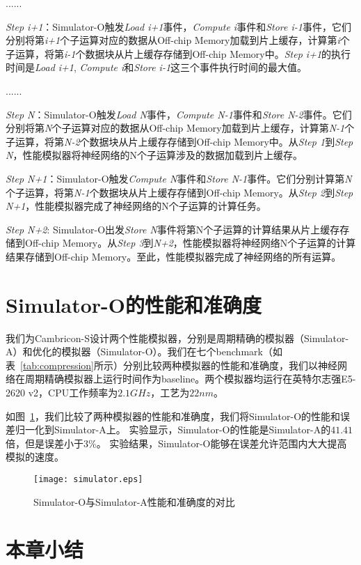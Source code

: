 ......

\emph{Step i+1}：Simulator-O触发\emph{Load i+1}事件，\emph{Compute i}事件和\emph{Store i-1}事件，它们分别将第\emph{i+1}个子运算对应的数据从Off-chip Memory加载到片上缓存，计算第\emph{i}个子运算，将第\emph{i-1}个数据块从片上缓存存储到Off-chip Memory中。\emph{Step i+1}的执行时间是\emph{Load i+1}, \emph{Compute i}和\emph{Store i-1}这三个事件执行时间的最大值。

......

\emph{Step N}：Simulator-O触发\emph{Load N}事件，\emph{Compute N-1}事件和\emph{Store N-2}事件。它们分别将第\emph{N}个子运算对应的数据从Off-chip Memory加载到片上缓存，计算第\emph{N-1}个子运算，将第\emph{N-2}个数据块从片上缓存存储到Off-chip Memory中。从\emph{Step 1}到\emph{Step N}，性能模拟器将神经网络的N个子运算涉及的数据加载到片上缓存。

\emph{Step N+1}：Simulator-O触发\emph{Compute N}事件和\emph{Store N-1}事件。它们分别计算第\emph{N}个子运算，将第\emph{N-1}个数据块从片上缓存存储到Off-chip Memory。从\emph{Step 2}到\emph{Step N+1}，性能模拟器完成了神经网络的N个子运算的计算任务。

\emph{Step N+2}: Simulator-O出发\emph{Store N}事件将第N个子运算的计算结果从片上缓存存储到Off-chip Memory。从\emph{Step 3}到\emph{N+2}，性能模拟器将神经网络N个子运算的计算结果存储到Off-chip Memory。至此，性能模拟器完成了神经网络的所有运算。

\section{Simulator-O的性能和准确度}
我们为Cambricon-S设计两个性能模拟器，分别是周期精确的模拟器（Simulator-A）和优化的模拟器（Simulator-O）。我们在七个benchmark（如表~\ref{tab:compression}所示）分别比较两种模拟器的性能和准确度，我们以神经网络在周期精确模拟器上运行时间作为baseline。两个模拟器均运行在英特尔志强E5-2620 v2，CPU工作频率为$2.1GHz$，工艺为$22nm$。

如图~\ref{fig:simulator1}，我们比较了两种模拟器的性能和准确度，我们将Simulator-O的性能和误差归一化到Simulator-A上。
实验显示，Simulator-O的性能是Simulator-A的$41.41$倍，但是误差小于$3\%$。
实验结果，Simulator-O能够在误差允许范围内大大提高模拟的速度。

\begin{figure}[h]
\centering
\texttt{[image: simulator.eps]}
\caption{Simulator-O与Simulator-A性能和准确度的对比}
\label{fig:simulator1}
\end{figure}

\section{本章小结}




